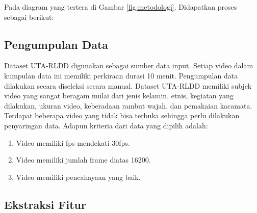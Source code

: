 Pada diagram yang tertera di Gambar \ref{fig:metodologi}. Didapatkan proses sebagai berikut:
\subsection{Pengumpulan Data}
Dataset UTA-RLDD digunakan sebagai sumber data input. Setiap video dalam kumpulan data ini memiliki perkiraan durasi
10 menit. Pengumpulan data dilakukan secara diseleksi secara manual. Dataset UTA-RLDD memiliki subjek video yang sangat beragam mulai
dari jenis kelamin, etnis, kegiatan yang dilakukan, ukuran video, keberadaan rambut wajah, dan pemakaian kacamata.
Terdapat beberapa video yang tidak bisa terbuka sehingga perlu dilakukan penyaringan data. Adapun kriteria dari
data yang dipilih adalah:
\begin{enumerate}[nolistsep]
      \item Video memiliki fps mendekati 30fps.
      \item Video memiliki jumlah frame diatas 16200.
      \item Video memiliki pencahayaan yang baik.
\end{enumerate}

\subsection{Ekstraksi Fitur}

